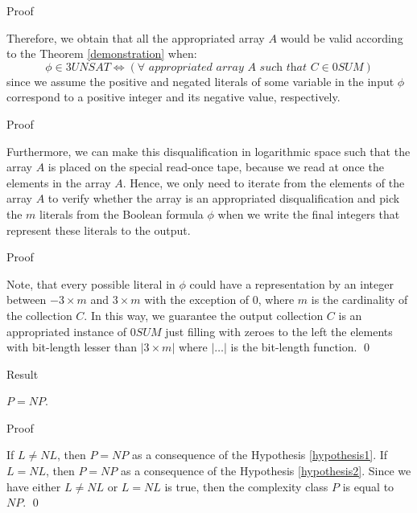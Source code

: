 \documentclass[11pt]{beamer}
\begin{document}
\begin{frame}{Proof}

Therefore, we obtain that all the appropriated array $A$ would be valid according to the Theorem \ref{demonstration} when:
\[\phi \in 3UNSAT \Leftrightarrow (\forall \textit{ appropriated array } A \textit{ such that } C \in 0SUM)\]
since we assume the positive and negated literals of some variable in the input $\phi$ correspond to a positive integer and its negative value, respectively.

\end{frame}

\begin{frame}{Proof}

Furthermore, we can make this disqualification in logarithmic space such that the array $A$ is placed on the special read-once tape, because we read at once the elements in the array $A$. Hence, we only need to iterate from the elements of the array $A$ to verify whether the array is an appropriated disqualification and pick the $m$ literals from the Boolean formula $\phi$ when we write the final integers that represent these literals to the output.

\end{frame}

\begin{frame}{Proof}

Note, that every possible literal in $\phi$ could have a representation by an integer between $-3 \times m$ and $3 \times m$ with the exception of $0$, where $m$ is the cardinality of the collection $C$. In this way, we guarantee the output collection $C$ is an appropriated instance of $0SUM$ just filling with zeroes to the left the elements with bit-length lesser than $|3 \times m|$ where $|\ldots|$ is the bit-length function. \qed

\end{frame}

\begin{frame}{Result}

\begin{theorem}
$P = NP$.
\end{theorem}

\end{frame}

\begin{frame}{Proof}

If $L \neq NL$, then $P = NP$ as a consequence of the Hypothesis \ref{hypothesis1}. If $L = NL$, then $P = NP$ as a consequence of the Hypothesis \ref{hypothesis2}. Since we have either $L \neq NL$ or $L = NL$ is true, then the complexity class $P$ is equal to $NP$. \qed

\end{frame}
\end{document}
